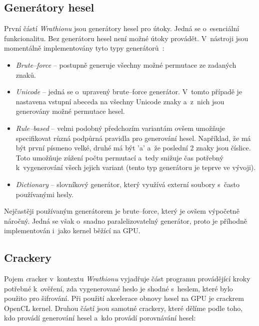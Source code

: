 \subsection{Generátory hesel}
První částí {\it Wrathionu} jsou generátory hesel pro útoky. Jedná se o~esenciální
funkcionalitu. Bez generátoru hesel není možné útoky provádět. V~nástroji jsou momentálně
implementovány tyto typy generátorů~\cite{Hranicky}:
\begin{itemize}
    \item {\it Brute--force} -- postupně generuje všechny možné permutace ze zadaných znaků.
    \item {\it Unicode} -- jedná se o~upravený brute--force generátor. V~tomto případě je nastavena
	vstupní abeceda na všechny Unicode znaky a~z~nich jsou generovány možné permutace hesel.
    \item {\it Rule--based} -- velmi podobný předchozím variantám ovšem umožňuje specifikovat
	různá podpůrná pravidla pro generování hesel. Například, že má být první písmeno velké,
	druhé má být 'a' a~že poslední 2 znaky jsou číslice. Toto umožňuje zúžení počtu permutací
	a~tedy snižuje čas potřebný k~vygenerování všech jejich variant (tento typ generátoru je
	teprve ve vývoji).
    \item {\it Dictionary} -- slovníkový generátor, který využívá externí soubory s~často
	používanými hesly.
\end{itemize}
Nejčastěji používaným generátorem je brute--force, který je ovšem výpočetně náročný. Jedná se
však o~snadno paralelizovatelný generátor, proto je příhodně implementován i~jako kernel běžící na
GPU.
\subsection{Crackery}
Pojem {\textit cracker} v~kontextu {\it Wrathionu} vyjadřuje část programu provádějící kroky
potřebné k~ověření, zda vygenerované heslo je shodné s~heslem, které bylo použito pro šifrování.
Při použití akcelerace obnovy hesel na GPU je crackrem OpenCL kernel. Druhou částí jsou samotné
crackery, které dělíme podle toho, kdo provádí generování hesel a~kdo provádí porovnávání hesel:

